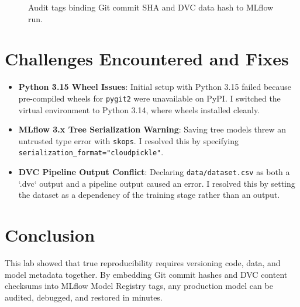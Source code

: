 \documentclass[11pt,a4paper]{article}
\begin{document}
\begin{figure}[htbp]
\centering
{}
\caption{Audit tags binding Git commit SHA and DVC data hash to MLflow run.}
\end{figure}

\section{Challenges Encountered and Fixes}
\begin{itemize}
    \item \textbf{Python 3.15 Wheel Issues}: Initial setup with Python 3.15 failed because pre-compiled wheels for \texttt{pygit2} were unavailable on PyPI. I switched the virtual environment to Python 3.14, where wheels installed cleanly.
    \item \textbf{MLflow 3.x Tree Serialization Warning}: Saving tree models threw an untrusted type error with \texttt{skops}. I resolved this by specifying \texttt{serialization\_format="cloudpickle"}.
    \item \textbf{DVC Pipeline Output Conflict}: Declaring \texttt{data/dataset.csv} as both a `.dvc` output and a pipeline output caused an error. I resolved this by setting the dataset as a dependency of the training stage rather than an output.
\end{itemize}

\section{Conclusion}
This lab showed that true reproducibility requires versioning code, data, and model metadata together. By embedding Git commit hashes and DVC content checksums into MLflow Model Registry tags, any production model can be audited, debugged, and restored in minutes.
\end{document}
